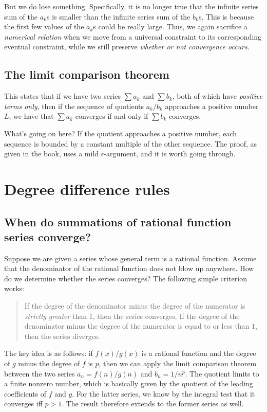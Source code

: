 \documentclass{amsart}
\begin{document}
But we do lose something. Specifically, it is no longer true that the
infinite series sum of the $a_k$s is smaller than the infinite series
sum of the $b_k$s. This is because the first few values of the $a_k$s
could be really large. Thus, we again sacrifice a {\em numerical
relation} when we move from a universal constraint to its
corresponding eventual constraint, while we still preserve {\em
whether or not convergence occurs}.
\subsection{The limit comparison theorem}

This states that if we have two series $\sum a_k$ and $\sum b_k$, both
of which have {\em positive terms only}, then if the sequence of
quotients $a_k/b_k$ approaches a positive number $L$, we have that
$\sum a_k$ converges if and only if $\sum b_k$ converges.

What's going on here? If the quotient approaches a positive number,
each sequence is bounded by a constant multiple of the other
sequence. The proof, as given in the book, uses a mild
$\epsilon$-argument, and it is worth going through.

\section{Degree difference rules}

\subsection{When do summations of rational function series converge?}

Suppose we are given a series whose general term is a rational
function. Assume that the denominator of the rational function does
not blow up anywhere. How do we determine whether the series
converges? The following simple criterion works:

\begin{quote}
  If the degree of the denominator minus the degree of the numerator
  is {\em strictly greater} than $1$, then the series converges. If
  the degree of the denominator minus the degree of the numerator is
  equal to or less than $1$, then the series diverges.
\end{quote}

The key idea is as follows: if $f(x)/g(x)$ is a rational function and
the degree of $g$ minus the degree of $f$ is $p$, then we can apply
the limit comparison theorem between the two series $a_n = f(n)/g(n)$
and $b_n = 1/n^p$. The quotient limits to a finite nonzero number,
which is basically given by the quotient of the leading coefficients
of $f$ and $g$. For the latter series, we know by the integral test
that it converges iff $p > 1$. The result therefore extends to the
former series as well.
\end{document}
